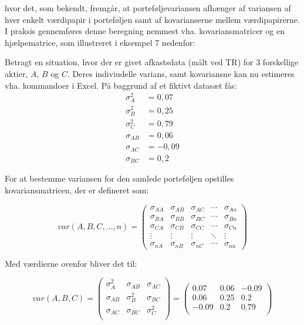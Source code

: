 \documentclass[10pt,reqno, usenames]{article}
\begin{document}
hvor det, som bekendt, fremgår, at porteføljevariansen afhænger  af variansen af hver enkelt værdipapir i porteføljen samt af kovarianserne mellem værdipapirerne. I praksis gennemføres denne beregning nemmest vha. kovariansmatricer og en hjælpematrice, som illustreret i eksempel 7 nedenfor: 


\begin{tcolorbox}[breakable, colback=red!5!white, colframe=red!50!black, title= Eksempel 7: Beregning af varians for en sammensat portefølje vha. kovarians- og hjælpematricer]

Betragt en situation, hvor der er givet afkastsdata (målt ved TR) for 3 forskellige aktier, $A$, $B$ og $C$. Deres indiviudelle varians, samt kovariansne kan nu estimeres vha. kommandoer i Excel. På baggrund af et fiktivt datasæt fås: 
\begin{align*}
    \sigma_A^2 &= 0,07 \\
    \sigma_B^2 &= 0,25 \\
    \sigma_C^2 &= 0,79 \\
    \sigma_{AB} &= 0,06 \\
    \sigma_{AC} &= -0,09 \\
    \sigma_{BC} &= 0,2 
\end{align*}

For at bestemme variansen for den samlede porteføljen opstilles kovariansmatricen, der er defineret som: 

\begin{equation}
var(A,B,C, \ldots, n) = 
\begin{pmatrix}
\sigma_{AA} & \sigma_{AB} & \sigma_{AC} & \cdots & \sigma_{An} \\
\sigma_{BA} & \sigma_{BB} & \sigma_{BC} & \cdots & \sigma_{Bn} \\
\sigma_{CA} & \sigma_{CB} & \sigma_{CC} & \cdots & \sigma_{Cn} \\
\vdots & \vdots & \vdots & \ddots & \vdots \\
\sigma_{nA} & \sigma_{nB} & \sigma_{nC} & \cdots & \sigma_{nn}
\end{pmatrix}
\end{equation}

Med værdierne ovenfor bliver det til: 

\begin{equation*}
    var(A,B,C) =
\begin{pmatrix}
\sigma_A^2 & \sigma_{AB} & \sigma_{AC} \\
\sigma_{AB} & \sigma_B^2 & \sigma_{BC} \\
\sigma_{AC} & \sigma_{BC} & \sigma_C^2 \\
\end{pmatrix}
=
\begin{pmatrix}
0.07 & 0.06 & -0.09 \\
0.06 & 0.25 & 0.2 \\
-0.09 & 0.2 & 0.79 \\
\end{pmatrix}
\end{equation*}


\end{tcolorbox}
\end{document}
